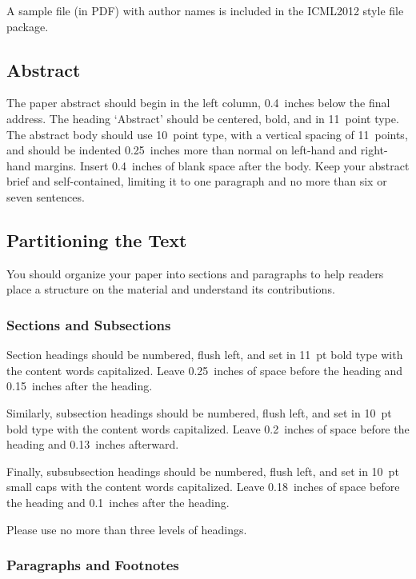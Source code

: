 \documentclass{article}
\begin{document}
A sample file (in PDF) with author names is included in the ICML2012 style file package.

\subsection{Abstract}

The paper abstract should begin in the left column, 0.4~inches below
the final address. The heading `Abstract' should be centered, bold,
and in 11~point type. The abstract body should use 10~point type, with
a vertical spacing of 11~points, and should be indented 0.25~inches
more than normal on left-hand and right-hand margins. Insert
0.4~inches of blank space after the body. Keep your abstract brief and self-contained,
limiting it to one paragraph and no more than six or seven sentences.

\subsection{Partitioning the Text}

You should organize your paper into sections and paragraphs to help
readers place a structure on the material and understand its
contributions.

\subsubsection{Sections and Subsections}

Section headings should be numbered, flush left, and set in 11~pt bold
type with the content words capitalized. Leave 0.25~inches of space
before the heading and 0.15~inches after the heading.

Similarly, subsection headings should be numbered, flush left, and set
in 10~pt bold type with the content words capitalized. Leave
0.2~inches of space before the heading and 0.13~inches afterward.

Finally, subsubsection headings should be numbered, flush left, and
set in 10~pt small caps with the content words capitalized. Leave
0.18~inches of space before the heading and 0.1~inches after the
heading.

Please use no more than three levels of headings.

\subsubsection{Paragraphs and Footnotes}
\end{document}

